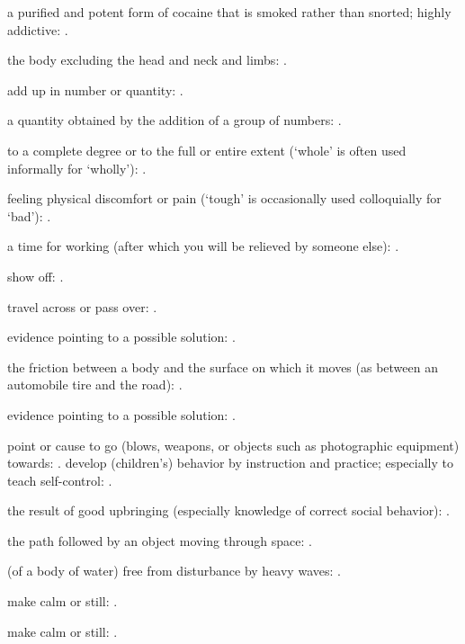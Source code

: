   a purified and potent form of cocaine that is smoked rather than snorted; highly addictive: .

  the body excluding the head and neck and limbs: .

  add up in number or quantity: .

  a quantity obtained by the addition of a group of numbers: .

  to a complete degree or to the full or entire extent (`whole' is often used informally for `wholly'): .

  feeling physical discomfort or pain (`tough' is occasionally used colloquially for `bad'): .

  a time for working (after which you will be relieved by someone else): .

  show off: .

  travel across or pass over: .

  evidence pointing to a possible solution: .

  the friction between a body and the surface on which it moves (as between an automobile tire and the road): .

  evidence pointing to a possible solution: .

  point or cause to go (blows, weapons, or objects such as photographic equipment) towards: . develop (children's) behavior by instruction and practice; especially to teach self-control: .

  the result of good upbringing (especially knowledge of correct social behavior): .

  the path followed by an object moving through space: .

  (of a body of water) free from disturbance by heavy waves: .

  make calm or still: .

  make calm or still: .


